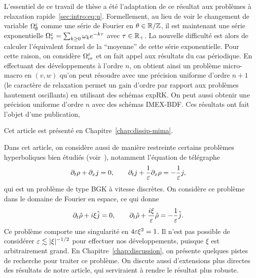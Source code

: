 L'essentiel de ce travail de thèse a été l'adaptation de ce résultat aux problèmes à relaxation rapide~\eqref{sec:intro:eq:u}. Formellement, au lieu de voir le changement de variable $\Omega^{\varepsilon}_\theta$ comme une série de Fourier en $\theta \in \mathbb{R}/\mathbb{Z}$, il est maintenant une série exponentielle $\Omega^{\varepsilon}_\tau = \sum_{k \geq 0} \omega_k e^{-k\tau}$ avec $\tau \in \mathbb{R}_+$. La nouvelle difficulté est alors de calculer l'équivalent formel de la \enquote{moyenne} de cette série exponentielle. Pour cette raison, on considère $\Omega^{\varepsilon}_{i\tau}$ et on fait appel aux résultats du cas périodique. En effectuant des développements à l'ordre $n$, on obtient ainsi un problème micro-macro en $(v,w)$ qu'on peut résoudre avec une précision uniforme d'ordre $n+1$ (le caractère de relaxation permet un gain d'ordre par rapport aux problèmes hautement oscillants) en utilisant des schémas expRK. On peut aussi obtenir une précision uniforme d'ordre $n$ avec des schémas IMEX-BDF. Ces résultats ont fait l'objet d'une publication, 
\begin{center}\begin{minipage}{.75\textwidth}
    \noindent
\end{minipage}\end{center}
Cet article est présenté en Chapitre~\ref{chap:dissip-mima}. 


Dans cet article, on considère aussi de manière restreinte certains problèmes hyperboliques bien étudiés (voir~\cite{jin.1999.efficient,lemou.2008.new,dimarco.2011.exponential,dimarco.2017.implicit,boscarino.2017.unified,albi.2020.implicit}), notamment l'équation de télégraphe 
\begin{equation*}
    \partial_t \rho + \partial_x j = 0,
    \qquad
    \partial_t j + \frac{1}{\varepsilon}\partial_x \rho = -\frac{1}{\varepsilon} j ,
\end{equation*}
qui est un problème de type BGK à vitesse discrètes. On considère ce problème dans le domaine de Fourier en espace, ce qui donne 
\begin{equation*}
    \partial_t \hat{\rho} + i\xi \hat{j} = 0,
    \qquad
    \partial_t \hat{\rho} + \frac{i\xi}{\varepsilon} \hat{\rho} = -\frac{1}{\varepsilon}\hat{j} .
\end{equation*}
Ce problème comporte une singularité en $4\varepsilon\xi^2 = 1$. Il n'est pas possible de considérer $\varepsilon \lesssim |\xi|^{-1/2}$ pour effectuer nos développements, puisque $\xi$ est arbitrairement grand. En Chapitre~\ref{chap:discussion}, on présente quelques pistes de recherche pour traiter ce problème. On discute aussi d'extensions plus directes des résultats de notre article, qui serviraient à rendre le résultat plus robuste. 